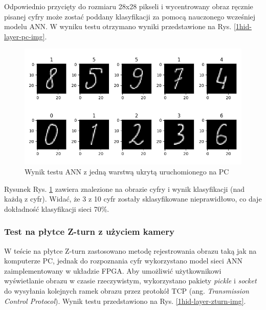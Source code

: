 Odpowiednio przycięty do rozmiaru 28x28 pikseli i wycentrowany obraz ręcznie pisanej cyfry może zostać poddany klasyfikacji za pomocą nauczonego wcześniej modelu ANN. W wyniku testu otrzymano wyniki przedstawione na Rys. \ref{1hid-layer-pc-img}. 

\begin{figure}[!h]
    \centering
    \includegraphics[width=\textwidth]{img/1hid-layer-pc-plot.png}
    \caption{Wynik testu ANN z jedną warstwą ukrytą uruchomionego na PC}
    \label{1hid-layer-pc-plot}
\end{figure}


Rysunek Rys. \ref{1hid-layer-pc-plot} zawiera znalezione na obrazie cyfry i wynik klasyfikacji (nad każdą z cyfr). Widać, że 3 z 10 cyfr zostały sklasyfikowane nieprawidłowo, co daje dokładność klasyfikacji sieci 70\%.

\subsubsection{Test na płytce Z-turn z użyciem kamery}

W teście na płytce Z-turn zastosowano metodę rejestrowania obrazu taką jak na komputerze PC, jednak do rozpoznania cyfr wykorzystano model sieci ANN zaimplementowany w układzie FPGA. Aby umożliwić użytkownikowi wyświetlanie obrazu w czasie rzeczywistym, wykorzystano pakiety \emph{pickle} i \emph{socket} do wysyłania kolejnych ramek obrazu przez protokół TCP (ang. \emph{Transmission Control Protocol}). Wynik testu przedstawiono na Rys. \ref{1hid-layer-zturn-img}.

